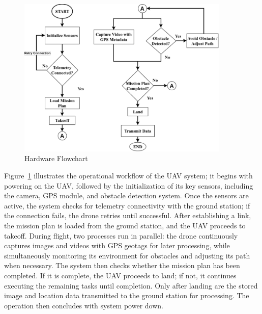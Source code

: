 \begin{figure}[H]
	\centering
	\caption{Hardware Flowchart}
	\label{fig:HardFlow}
	\includegraphics[width=0.9\textwidth]{figures/hardware_flowchart.pdf}
\end{figure}
Figure~\ref{fig:HardFlow} illustrates the operational workflow of the UAV system; it begins with powering on the UAV, followed by the initialization of its key sensors, including the camera, GPS module, and obstacle detection system. Once the sensors are active, the system checks for telemetry connectivity with the ground station; if the connection fails, the drone retries until successful. After establishing a link, the mission plan is loaded from the ground station, and the UAV proceeds to takeoff. During flight, two processes run in parallel: the drone continuously captures images and videos with GPS geotags for later processing, while simultaneously monitoring its environment for obstacles and adjusting its path when necessary. The system then checks whether the mission plan has been completed. If it is complete, the UAV proceeds to land; if not, it continues executing the remaining tasks until completion. Only after landing are the stored image and location data transmitted to the ground station for processing. The operation then concludes with system power down.

